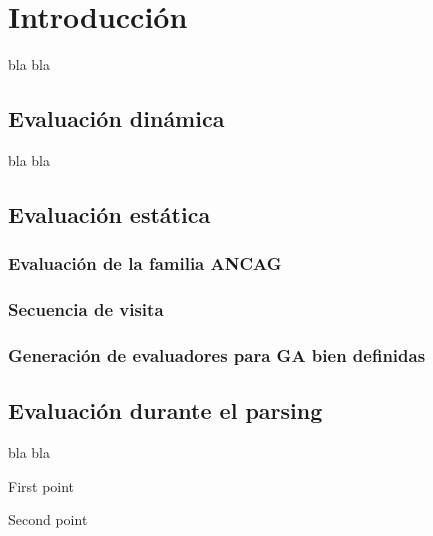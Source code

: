 \chapter{Introducción}
\label{chap:met_eval}
\minitoc


bla bla

\section{Evaluación dinámica}

bla bla

\section{Evaluación estática}

\subsection{Evaluación de la familia ANCAG}
\subsection{Secuencia de visita}
\subsection{Generación de evaluadores para GA bien definidas}
\section{Evaluación durante el parsing}

bla bla

\begin{bulletList}
 \item First point
 \item Second point
\end{bulletList}
